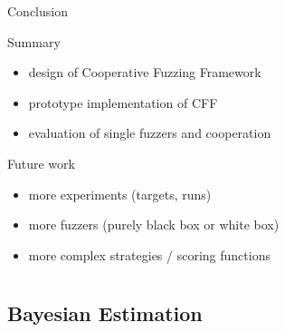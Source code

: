 \documentclass[\HandoutMode,table]{beamer}
\begin{document}
\begin{frame}
    {Conclusion}
    \begin{block}{Summary}
        \begin{itemize}
            \item{} design of Cooperative Fuzzing Framework
            \item{} prototype implementation of CFF
            \item{} evaluation of single fuzzers and cooperation
        \end{itemize}
    \end{block}
    \begin{block}{Future work}
        \begin{itemize}
            \item{} more experiments (targets, runs)
            \item{} more fuzzers (purely black box or white box)
            \item{} more complex strategies / scoring functions
        \end{itemize}
    \end{block}
\end{frame}

\appendix

\section{\appendixname}


\begin{frame}[noframenumbering]
    \tableofcontents[]
\end{frame}

\AtBeginSubsection[]{}

\subsection{Bayesian Estimation}
\end{document}
